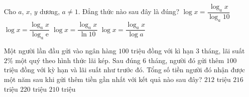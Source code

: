\begin{ex}%
	Cho $a$, $x$, $y$ dương, $a \neq 1$. Đẳng thức nào sau đây là đúng?	
	\choice
	{\True $\log x = \dfrac{\log_a x}{\log_a 10}$}
	{$\log x = \dfrac{\log_a x}{\log_a \mathrm{e}}$}
	{$\log x = \dfrac{\log_a x}{\ln 10}$}
	{$\log x = \dfrac{\log_a x}{\log a}$}
\end{ex}

\begin{ex}%
	Một người lần đầu gửi vào ngân hàng $100$ triệu đồng với kì hạn $3$ tháng, lãi suất $2\% $ một quý theo hình thức lãi kép. Sau đúng $6$ tháng, người đó gửi thêm $100$ triệu đồng với kỳ hạn và lãi suất như trước đó. Tổng số tiền người đó nhận được một năm sau khi gửi thêm tiền gần nhất với kết quả nào sau đây?  	
	\choice
	{$212$ triệu}
	{$216$ triệu}
	{\True $220$ triệu}
	{$210$ triệu}
\end{ex}

